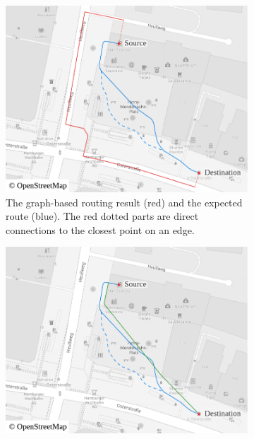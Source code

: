			\begin{figure}[h!]
				\begin{minipage}[t]{.48\textwidth}
					\begin{subfigure}[t]{\linewidth}
						\begin{figcenter}
							\includegraphics[width=\textwidth]{images/qgis-routing-osterstrasse-expected-vs-routing}
						\end{figcenter}
						\caption{The graph-based routing result (red) and the expected route (blue). The red dotted parts are direct connections to the closest point on an edge.}
						\label{fig:eval-osterstrasse-route-expected}
					\end{subfigure}
				\end{minipage}
				\hfill
				\begin{minipage}[t]{.48\textwidth}
					\begin{subfigure}[t]{\linewidth}
						\begin{figcenter}
							\includegraphics[width=\textwidth]{images/qgis-routing-osterstrasse-expected-vs-actual}

\end{figcenter}
\end{subfigure}
\end{minipage}
\end{figure}
